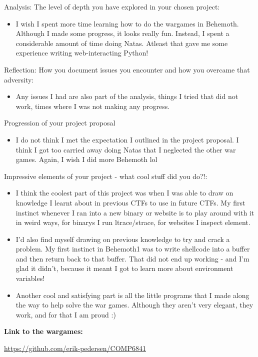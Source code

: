 \documentclass{article}
\begin{document}
Analysis: The level of depth you have explored in your chosen project:

\begin{itemize}
	\item I wish I spent more time learning how to do the wargames in Behemoth. Although I made some progress, it looks really fun. Instead, I spent a considerable amount of time doing Natas. Atleast that gave me some experience writing web-interacting Python!
\end{itemize}

Reflection: How you document issues you encounter and how you overcame that adversity:

\begin{itemize}
	\item Any issues I had are also part of the analysis, things I tried that did not work, times where I was not making any progress.
\end{itemize}

Progression of your project proposal

\begin{itemize}
	\item I do not think I met the expectation I outlined in the project proposal. I think I got too carried away doing Natas that I neglected the other war games. Again, I wish I did more Behemoth lol
\end{itemize}

Impressive elements of your project - what cool stuff did you do?!:

\begin{itemize}
	\item I think the coolest part of this project was when I was able to draw on knowledge I learnt about in previous CTFs to use in future CTFs. My first instinct whenever I ran into a new binary or website is to play around with it in weird ways, for binarys I run ltrace/strace, for websites I inspect element. 
	\item I'd also find myself drawing on previous knowledge to try and crack a problem. My first instinct in Behemoth1 was to write shellcode into a buffer and then return back to that buffer. That did not end up working - and I'm glad it didn't, because it meant I got to learn more about environment variables!
	\item Another cool and satisfying part is all the little programs that I made along the way to help solve the war games. Although they aren't very elegant, they work, and for that I am proud :)
\end{itemize}

\textbf{Link to the wargames:}

\url{https://github.com/erik-pedersen/COMP6841}
\end{document}
